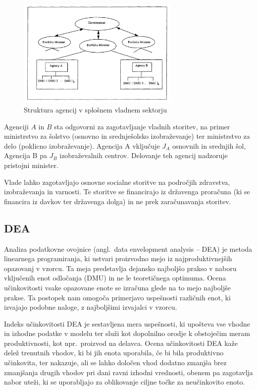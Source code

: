 \documentclass[12pt,a4paper]{article}
\theoremstyle{definition}
\begin{document}
\begin{figure}[htbp]
    \centering
    \includegraphics[width=0.7\textwidth]{government_structure.png}
    \caption{Struktura agencij v splošnem vladnem sektorju}
    \label{fig:government_structure}
\end{figure}

Agenciji $A$ in $B$ sta odgovorni za zagotavljanje vladnih storitev, 
na primer ministrstvo za šolstvo (osnovno in srednješolsko 
izobraževanje) ter ministrstvo za delo (poklicno izobraževanje).
Agencija A vključuje $J_A$ osnovnih in srednjih šol, Agencija B 
pa $J_B$ izobraževalnih centrov. Delovanje teh agencij nadzoruje
pristojni minister. \cite{Yaisawarng2002}

Vlade lahko zagotavljajo osnovne socialne storitve na področjih
zdravstva, izobraževanja in varnosti. Te storitve se financirajo
iz državenga proračuna (ki se financira iz davkov ter državenga
dolga) in ne prek zaračunavanja storitev. 

\subsection{DEA}

Analiza podatkovne ovojnice (angl.\ data envelopment analysis -- DEA) je 
metoda linearnega programiranja, ki ustvari proizvodno mejo iz 
najproduktivnejših opazovanj v vzorcu. Ta meja predstavlja 
dejansko najboljšo prakso v naboru vključenih enot odločanja
(DMU) in ne le teoretičnega optimuma. Ocena učinkovitosti 
vsake opazovane enote se izračuna glede na to mejo najboljše 
prakse. Ta postopek nam omogoča primerjavo uspešnosti različnih
enot, ki izvajajo podobne naloge, z najboljšimi izvajalci
v vzorcu. \cite{Yaisawarng2002}

Indeks učinkovitosti DEA je sestavljena mera uspešnosti,
ki upošteva vse vhodne in izhodne podatke v modelu ter služi
kot dopolnilno orodje k obstoječim meram produktivnosti,
kot npr.\ proizvod na delavca. Ocena učinkovitosti DEA
kaže delež trenutnih vhodov, ki
bi jih enota uporabila, če bi bila produktivno učinkovita,
ter nakazuje, ali se lahko določen vhod dodatno zmanjša brez
zmanjšanja drugih vhodov pri dani ravni izhodni vrednosti,
obenem pa zagotavlja nabor uteži, ki se uporabljajo za
oblikovanje ciljne točke za neučinkovito enoto. \cite{Yaisawarng2002}
\end{document}
